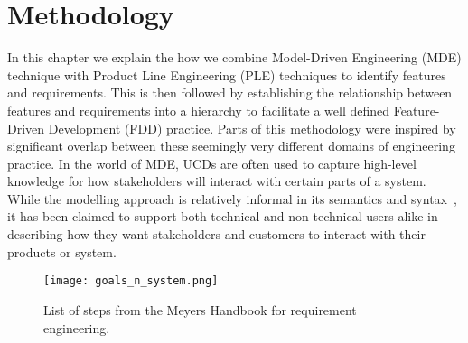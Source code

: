 \chapter{Methodology}



In this chapter we explain the how we combine Model-Driven Engineering (MDE) technique with Product Line Engineering (PLE) techniques to identify features and requirements. This is then followed by establishing the relationship between features and requirements into a hierarchy to facilitate a well defined Feature-Driven Development (FDD) practice. Parts of this methodology were inspired by significant overlap between these seemingly very different domains of engineering practice. In the world of \ac{MDE}, \acfp{UCD} are often used to capture high-level knowledge for how stakeholders will interact with certain parts of a system. While the modelling approach is relatively informal in its semantics and syntax~\cite{fowler2018uml, lamsweerde2009requirements}, it has been claimed to support both technical and non-technical users alike in describing how they want stakeholders and customers to interact with their products or system.


\begin{figure}
	\centering
	\texttt{[image: goals\_n\_system.png]}
	\caption{List of steps from the Meyers Handbook for requirement engineering.}
	\label{fig:goals_n_system}
\end{figure}

